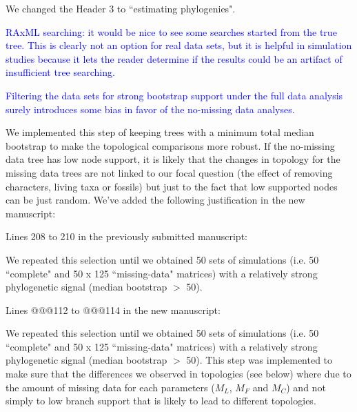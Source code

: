 \documentclass[11pt]{letter}
\begin{document}
\begin{letter}{}
We changed the Header 3 to ``estimating phylogenies". %


\textcolor{blue}{RAxML searching: it would be nice to see some searches started from the true tree. This is clearly not an option for real data sets, but it is helpful in simulation studies because it lets the reader determine if the results could be an artifact of insufficient tree searching.}



\textcolor{blue}{Filtering the data sets for strong bootstrap support under the full data analysis surely introduces some bias in favor of the no-missing data analyses.}

We implemented this step of keeping trees with a minimum total median bootstrap to make the topological comparisons more robust. If the no-missing data tree has low node support, it is likely that the changes in topology for the missing data trees are not linked to our focal question (the effect of removing characters, living taxa or fossils) but just to the fact that low supported nodes can be just random. We've added the following justification in the new manuscript:

Lines 208 to 210 in the previously submitted manuscript:

\hfill\begin{minipage}{\dimexpr\textwidth-1cm}
We repeated this selection until we obtained 50 sets of simulations (i.e. 50 ``complete" and 50 x 125 ``missing-data" matrices) with a relatively strong phylogenetic signal (median bootstrap $>$ 50).
\end{minipage}

Lines @@@112 to @@@114 in the new manuscript:

\hfill\begin{minipage}{\dimexpr\textwidth-1cm}
We repeated this selection until we obtained 50 sets of simulations (i.e. 50 ``complete" and 50 x 125 ``missing-data" matrices) with a relatively strong phylogenetic signal (median bootstrap $>$ 50). This step was implemented to make sure that the differences we observed in topologies (see below) where due to the amount of missing data for each parameters ($M_L$, $M_F$ and $M_C$) and not simply to low branch support that is likely to lead to different topologies.
\end{minipage}


\end{letter}
\end{document}
